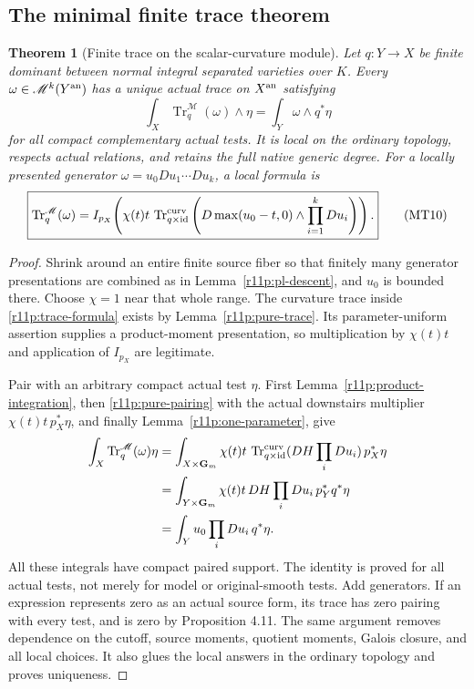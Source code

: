 \documentclass[11pt]{article}
\newtheorem{theorem}{Theorem}[section]
\theoremstyle{definition}
\theoremstyle{remark}
\numberwithin{equation}{section}
\begin{document}
\subsection{The minimal finite trace theorem}

\begin{theorem}[Finite trace on the scalar-curvature module]
\label{r11p:minimal-trace-theorem}
Let $q:Y\to X$ be finite dominant between normal integral separated
varieties over $K$.  Every $\omega\in\mathscr M^k(Y^{\rm an})$ has a
unique actual trace on $X^{\rm an}$ satisfying
\[
                 \int_X\operatorname{Tr}^{\mathscr M}_q(\omega)
                                      \wedge\eta
                          =\int_Y\omega\wedge q^*\eta
\tag{MT9}\label{r11p:minimal-pairing}
\]
for all compact complementary actual tests.  It is local on the
ordinary topology, respects actual relations, and retains the full
native generic degree.  For a locally presented generator
$\omega=u_0Du_1\cdots Du_k$, a local formula is
\[
 \boxed{\displaystyle
 \operatorname{Tr}^{\mathscr M}_q(\omega)
 = I_{p_X}\!\left(
     \chi(t)t\,
     \operatorname{Tr}^{\rm curv}_{q\times\operatorname{id}}
       \left(D\max(u_0-t,0)\wedge\prod_{i=1}^kDu_i\right)
                         \right).}
\tag{MT10}\label{r11p:trace-formula}
\]
\end{theorem}

\begin{proof}
Shrink around an entire finite source fiber so that finitely many
generator presentations are combined as in
Lemma~\ref{r11p:pl-descent}, and $u_0$ is bounded there.  Choose
$\chi=1$ near that whole range.  The curvature trace inside
\eqref{r11p:trace-formula} exists by Lemma~\ref{r11p:pure-trace}.
Its parameter-uniform assertion supplies a product-moment presentation,
so multiplication by $\chi(t)t$ and application of $I_{p_X}$ are
legitimate.

Pair with an arbitrary compact actual test $\eta$.  First
Lemma~\ref{r11p:product-integration}, then
\eqref{r11p:pure-pairing} with the actual downstairs multiplier
$\chi(t)t\,p_X^*\eta$, and finally
Lemma~\ref{r11p:one-parameter}, give
\[
\begin{split}
 \int_X\operatorname{Tr}^{\mathscr M}_q(\omega)\eta
 &=\int_{X\times\mathbf G_m}\chi(t)t\,
     \operatorname{Tr}^{\rm curv}_{q\times\operatorname{id}}
        (DH\prod_iDu_i)\,p_X^*\eta\\
 &=\int_{Y\times\mathbf G_m}\chi(t)t\,DH\prod_iDu_i\,
                                          p_Y^*q^*\eta\\
 &=\int_Yu_0\prod_iDu_i\,q^*\eta.
\end{split}
\]
All these integrals have compact paired support.  The identity is
proved for all actual tests, not merely for model or original-smooth
tests.  Add generators.  If an expression represents zero as an
actual source form, its trace has zero pairing with every test, and
is zero by Proposition 4.11.  The same argument removes dependence
on the cutoff, source moments, quotient moments, Galois closure, and
all local choices.  It also glues the local answers in the ordinary
topology and proves uniqueness.
\end{proof}
\end{document}
